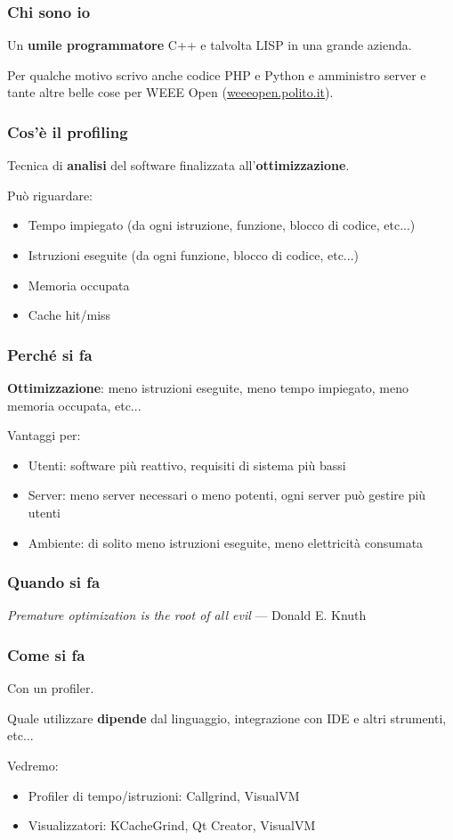 \documentclass[aspectratio=169]{beamer}
\title{\mytitle}
\author{Ludovico Pavesi}
\date{2020-10-24}
\begin{document}
	
	\frame{\titlepage}
		
	\begin{frame}
		\frametitle{Chi sono io}
		Un \textbf{umile programmatore} C++ e talvolta LISP in una grande azienda.
		
		Per qualche motivo scrivo anche codice PHP e Python e amministro server e tante altre belle cose per WEEE Open (\href{http://weeeopen.polito.it}{weeeopen.polito.it}).
	\end{frame}

	\begin{frame}
		\frametitle{Cos'è il profiling}
		Tecnica di \textbf{analisi} del software finalizzata all'\textbf{ottimizzazione}.
		
		Può riguardare:
		\begin{itemize}
			\item Tempo impiegato (da ogni istruzione, funzione, blocco di codice, etc...)
			\item Istruzioni eseguite (da ogni funzione, blocco di codice, etc...)
			\item Memoria occupata
			\item Cache hit/miss
		\end{itemize}
	\end{frame}

\begin{frame}
	\frametitle{Perché si fa}
	\textbf{Ottimizzazione}: meno istruzioni eseguite, meno tempo impiegato, meno memoria occupata, etc...
	
	Vantaggi per:
	\begin{itemize}
		\item Utenti: software più reattivo, requisiti di sistema più bassi
		\item Server: meno server necessari o meno potenti, ogni server può gestire più utenti
		\item Ambiente: di solito meno istruzioni eseguite, meno elettricità consumata
	\end{itemize}
\end{frame}

\begin{frame}
	\frametitle{Quando si fa}
	\textit{Premature optimization is the root of all evil} — Donald E. Knuth
\end{frame}

\begin{frame}
	\frametitle{Come si fa}
	Con un profiler.
	
	Quale utilizzare \textbf{dipende} dal linguaggio, integrazione con IDE e altri strumenti, etc...
	
	Vedremo:
	
	\begin{itemize}
		\item Profiler di tempo/istruzioni: Callgrind, VisualVM
		\item Visualizzatori: KCacheGrind, Qt Creator, VisualVM
	\end{itemize}
\end{frame}
\end{document}
